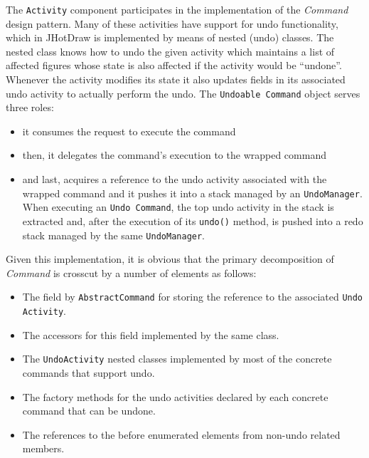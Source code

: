 The \texttt{Activity} component participates in the implementation of the \textit{Command} design pattern\cite{gamma1995design}. 
Many of these activities have support for undo functionality, which in JHotDraw is implemented by means of nested (undo) classes. 
The nested class knows how to undo the given activity which maintains a list of affected figures whose state is also affected if the activity would be ``undone''. 
Whenever the activity modifies its state it also updates fields in its associated undo activity to actually perform the undo. 
The \texttt{Undoable Command} object serves three roles: 

\begin{itemize}
	\item it consumes the request to execute the command

	\item then, it delegates the command's execution to the wrapped command 

	\item and last, acquires a reference to the undo activity associated with the wrapped command and it pushes it into a stack managed by an \texttt{UndoManager}. 
	When executing an \texttt{Undo Command}, the top undo activity in the stack is extracted and, after the execution of its \texttt{undo()} method, is pushed into a redo stack managed by the same \texttt{UndoManager}.
\end{itemize}

Given this implementation, it is obvious that the primary decomposition of \textit{Command} is crosscut by a number of elements as follows: 

\begin{itemize}
	\item The field by \texttt{AbstractCommand} for storing the reference to the associated \texttt{Undo Activity}.

	\item The accessors for this field implemented by the same class.

	\item The \texttt{UndoActivity} nested classes implemented by most of the concrete commands that support undo.

	\item The factory methods for the undo activities declared by each concrete command that can be undone.
	
	\item The references to the before enumerated elements from non-undo related members.
\end{itemize}

